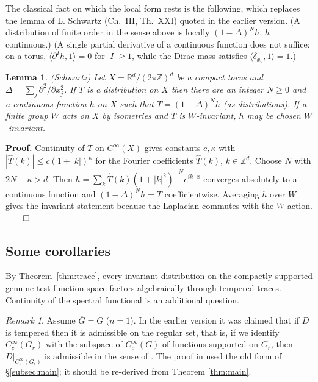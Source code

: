 \documentclass[12pt,letterpaper]{article}
\newtheorem{lemma}[theorem]{Lemma}
\theoremstyle{definition}
\theoremstyle{remark}
\newtheorem{remark}[theorem]{Remark}
\newcommand{\R}{\mathbb R}
\newcommand{\Z}{\mathbb Z}
\newcommand{\verify}[1]{\textit{[verification pending: #1]}}
\begin{document}
\medskip
The classical fact on which the local form rests is the following, which replaces the lemma
of L. Schwartz \cite{Sc50} (Ch.~III, Th.~XXI) quoted in the earlier version. (A distribution of finite order in the sense
above is locally $(1-\Delta)^Nh$, $h$ continuous.) (A single partial derivative of a
continuous function does not suffice: on a torus, $\langle\partial^Ih,1\rangle=0$ for $|I|\ge1$, while the Dirac mass
satisfies $\langle\delta_{x_0},1\rangle=1$.)

\begin{lemma} (Schwartz)
\label{lemma:schwartz}
Let $X=\R^d/(2\pi\Z)^d$ be a compact torus and $\Delta=\sum_j\partial^2/\partial x_j^2$. If $T$ is a distribution
on $X$ then there are an integer $N\ge0$ and a continuous function $h$ on $X$ such that
$T=(1-\Delta)^Nh$ (as distributions). If a finite group $W$ acts on $X$ by isometries and $T$ is $W$-invariant, $h$ may be chosen $W$-invariant.
\end{lemma}
\noindent
{\bf Proof.} Continuity of $T$ on $C^\infty(X)$ gives constants $c,\kappa$ with $|\widehat T(k)|\le c(1+|k|)^\kappa$ for
the Fourier coefficients $\widehat T(k)$, $k\in\Z^d$. Choose $N$ with $2N-\kappa>d$. Then
$h=\sum_k\widehat T(k)(1+|k|^2)^{-N}e^{ik\cdot x}$ converges absolutely to a continuous function and
$(1-\Delta)^Nh=T$ coefficientwise. Averaging $h$ over $W$ gives the invariant statement because the Laplacian commutes with the $W$-action. $\qed$



\subsection{Some corollaries}

By Theorem~\ref{thm:trace}, every invariant distribution on the compactly supported genuine test-function space factors algebraically through tempered traces.  Continuity of the spectral functional is an additional question.

\begin{remark}
Assume $\overline{G }=G$ ($n=1$).
In the earlier version it was claimed that if $D$ is tempered then it is admissible on the regular set,
that is, if we identify $C_c^\infty(G_{r})$ with the subspace of $C_c^\infty(G)$ of functions supported on
$G_r$, then $D|_{C_c^\infty(G_{r})}$ is admissible in the sense of \cite{HC78}. The proof in \cite{Jo01}
used the old form of \S\ref{subsec:main}; it should be re-derived from Theorem \ref{thm:main}.
\end{remark}
\end{document}
